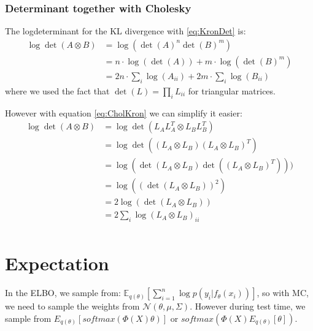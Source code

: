 \documentclass[a4paper]{scrartcl}
\begin{document}
      \subsubsection{Determinant together with Cholesky}
          The logdeterminant for the KL divergence with \ref{eq:KronDet} is:
          \begin{align}\label{eq:CholDet}
            \log \det (A \otimes B)
            &= \log (\det (A)^n \det (B)^m)\\
            &= n \cdot \log (\det (A)) + m \cdot \log ( \det (B)^m)\\
            &= 2n \cdot \sum_i \log (A_{ii}) + 2m \cdot \sum_i \log (B_{ii})
          \end{align}
          where we used the fact that $\det(L) = \prod_i L_{ii}$ for triangular matrices.

          However with equation \ref{eq:CholKron} we can simplify it easier:
          \begin{align}
            \log \det (A \otimes B)
            &= \log \det (L_AL_A^T \otimes L_BL_B^T)\\
            &= \log \det ((L_A \otimes L_B) (L_A \otimes L_B)^T)\\
            &= \log (\det (L_A \otimes L_B) \det((L_A \otimes L_B)^T)))\\
            &= \log ((\det (L_A \otimes L_B))^2)\\
            &= 2\log (\det (L_A \otimes L_B))\\
            &= 2 \sum_i \log (L_A \otimes L_B)_{ii}\\
          \end{align}
        
        
        
  
          

\section{Expectation}
In the ELBO, we sample from:
$\mathbb{E}_{q(\theta)}[\sum_{i=1}^n \log{p(y_i \vert f_{\theta}(x_i))}]$,
so with MC, we need to sample the weights from $\mathcal{N}(\theta, \mu, \Sigma)$.
However during test time, we sample from ${E}_{q(\theta)} [softmax(\Phi(X)\theta)]$
or $softmax(\Phi(X) E_{q(\theta)}[\theta])$.
\end{document}
